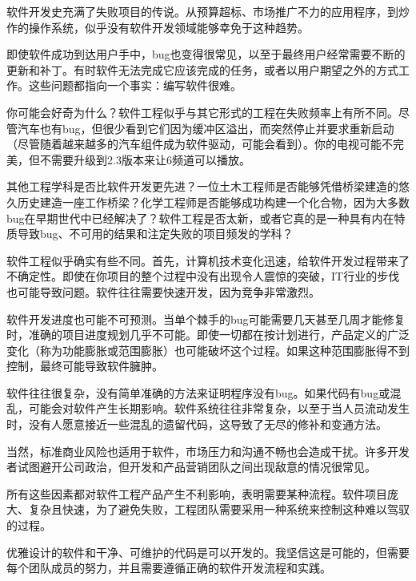 软件开发史充满了失败项目的传说。从预算超标、市场推广不力的应用程序，到炒作的操作系统，似乎没有软件开发领域能够幸免于这种趋势。

即使软件成功到达用户手中，bug也变得很常见，以至于最终用户经常需要不断的更新和补丁。有时软件无法完成它应该完成的任务，或者以用户期望之外的方式工作。这些问题都指向一个事实：编写软件很难。

你可能会好奇为什么？软件工程似乎与其它形式的工程在失败频率上有所不同。尽管汽车也有bug，但很少看到它们因为缓冲区溢出，而突然停止并要求重新启动（尽管随着越来越多的汽车组件成为软件驱动，可能会看到）。你的电视可能不完美，但不需要升级到2.3版本来让6频道可以播放。

其他工程学科是否比软件开发更先进？一位土木工程师是否能够凭借桥梁建造的悠久历史建造一座工作桥梁？化学工程师是否能够成功构建一个化合物，因为大多数bug在早期世代中已经解决了？软件工程是否太新，或者它真的是一种具有内在特质导致bug、不可用的结果和注定失败的项目频发的学科？

软件工程似乎确实有些不同。首先，计算机技术变化迅速，给软件开发过程带来了不确定性。即使在你项目的整个过程中没有出现令人震惊的突破，IT行业的步伐也可能导致问题。软件往往需要快速开发，因为竞争非常激烈。

软件开发进度也可能不可预测。当单个棘手的bug可能需要几天甚至几周才能修复时，准确的项目进度规划几乎不可能。即使一切都在按计划进行，产品定义的广泛变化（称为功能膨胀或范围膨胀）也可能破坏这个过程。如果这种范围膨胀得不到控制，最终可能导致软件臃肿。

软件往往很复杂，没有简单准确的方法来证明程序没有bug。如果代码有bug或混乱，可能会对软件产生长期影响。软件系统往往非常复杂，以至于当人员流动发生时，没有人愿意接近一些混乱的遗留代码，这导致了无尽的修补和变通方法。

当然，标准商业风险也适用于软件，市场压力和沟通不畅也会造成干扰。许多开发者试图避开公司政治，但开发和产品营销团队之间出现敌意的情况很常见。

所有这些因素都对软件工程产品产生不利影响，表明需要某种流程。软件项目庞大、复杂且快速，为了避免失败，工程团队需要采用一种系统来控制这种难以驾驭的过程。

优雅设计的软件和干净、可维护的代码是可以开发的。我坚信这是可能的，但需要每个团队成员的努力，并且需要遵循正确的软件开发流程和实践。



















